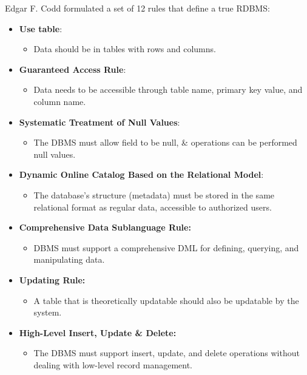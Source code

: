 
\begin{flushleft}
	
	Edgar F. Codd formulated a set of 12 rules that define a true RDBMS:
	\begin{itemize}
		\item \textbf{Use table}: 
		\begin{itemize}
			\item Data should be in tables with rows and columns.
		\end{itemize}
		
		\item \textbf{Guaranteed Access Rule}: 
		\begin{itemize}
			\item Data needs to be accessible through table name, primary key value, and column name.
		\end{itemize}
		
		\item \textbf{Systematic Treatment of Null Values}:
		\begin{itemize}
			\item The DBMS must allow field to be null, \& operations can be performed null values.
		\end{itemize} 
	
		\item \textbf{Dynamic Online Catalog Based on the Relational Model}: 
		\begin{itemize}
			\item The database's structure (metadata) must be stored in the same relational format as regular data, accessible to authorized users.
		\end{itemize}
		
		\item \textbf{Comprehensive Data Sublanguage Rule:}
		\begin{itemize}
			\item DBMS must support a comprehensive DML for defining, querying, and manipulating data.
		\end{itemize} 
	
		\item \textbf{Updating Rule:} 
		\begin{itemize}
			\item A table that is theoretically updatable should also be updatable by the system.
		\end{itemize}
		
		\item \textbf{High-Level Insert, Update \& Delete:} 
		\begin{itemize}
			\item The DBMS must support  insert, update, and delete operations without dealing with low-level record management.
		\end{itemize}
		

\end{itemize}
\end{flushleft}
